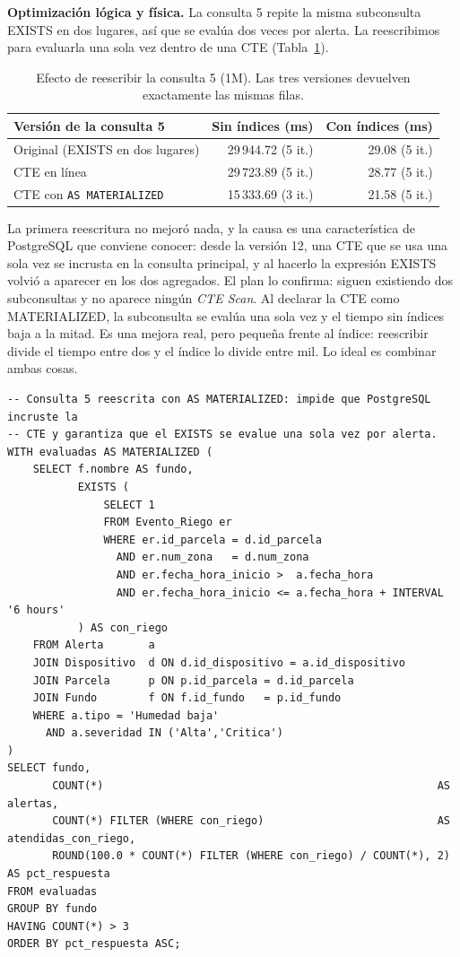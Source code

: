 \documentclass[11pt,letterpaper]{article}
\newcommand{\tbus}{\textunderscore\allowbreak}
\newcommand{\tb}[1]{{\ttfamily\let\_\tbus #1}}
\begin{document}
\textbf{Optimización lógica y física.} La consulta 5 repite la misma subconsulta \tb{EXISTS} en dos lugares, así que se evalúa dos veces por alerta. La reescribimos para evaluarla una sola vez dentro de una CTE (Tabla~\ref{tab:reescritura}).

\begin{table}[H]
\centering\small
\begin{tabular}{lrr}
\toprule
Versión de la consulta 5 & Sin índices (ms) & Con índices (ms) \\
\midrule
Original (EXISTS en dos lugares) & 29\,944.72 (5 it.) & 29.08 (5 it.) \\
CTE en línea & 29\,723.89 (5 it.) & 28.77 (5 it.) \\
CTE con \texttt{AS MATERIALIZED} & 15\,333.69 (3 it.) & 21.58 (5 it.) \\
\bottomrule
\end{tabular}
\caption{Efecto de reescribir la consulta 5 (1M). Las tres versiones devuelven exactamente las mismas filas.}\label{tab:reescritura}
\end{table}


La primera reescritura no mejoró nada, y la causa es una característica de PostgreSQL que conviene conocer: desde la versión 12, una CTE que se usa una sola vez se incrusta en la consulta principal, y al hacerlo la expresión \tb{EXISTS} volvió a aparecer en los dos agregados. El plan lo confirma: siguen existiendo dos subconsultas y no aparece ningún \emph{CTE Scan}. Al declarar la CTE como \tb{MATERIALIZED}, la subconsulta se evalúa una sola vez y el tiempo sin índices baja a la mitad. Es una mejora real, pero pequeña frente al índice: reescribir divide el tiempo entre dos y el índice lo divide entre mil. Lo ideal es combinar ambas cosas.

\begin{lstlisting}[style=sql, title={03c\_consulta5\_materializada.sql}]
-- Consulta 5 reescrita con AS MATERIALIZED: impide que PostgreSQL incruste la
-- CTE y garantiza que el EXISTS se evalue una sola vez por alerta.
WITH evaluadas AS MATERIALIZED (
    SELECT f.nombre AS fundo,
           EXISTS (
               SELECT 1
               FROM Evento_Riego er
               WHERE er.id_parcela = d.id_parcela
                 AND er.num_zona   = d.num_zona
                 AND er.fecha_hora_inicio >  a.fecha_hora
                 AND er.fecha_hora_inicio <= a.fecha_hora + INTERVAL '6 hours'
           ) AS con_riego
    FROM Alerta       a
    JOIN Dispositivo  d ON d.id_dispositivo = a.id_dispositivo
    JOIN Parcela      p ON p.id_parcela = d.id_parcela
    JOIN Fundo        f ON f.id_fundo   = p.id_fundo
    WHERE a.tipo = 'Humedad baja'
      AND a.severidad IN ('Alta','Critica')
)
SELECT fundo,
       COUNT(*)                                                    AS alertas,
       COUNT(*) FILTER (WHERE con_riego)                           AS atendidas_con_riego,
       ROUND(100.0 * COUNT(*) FILTER (WHERE con_riego) / COUNT(*), 2) AS pct_respuesta
FROM evaluadas
GROUP BY fundo
HAVING COUNT(*) > 3
ORDER BY pct_respuesta ASC;
\end{lstlisting}
\end{document}

